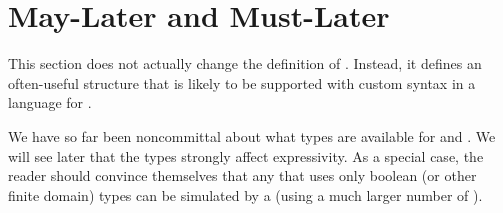 \documentclass[12pt]{article}
\begin{document}
\section{May-Later and Must-Later}  \label{slater}

This section does not actually change the definition of \Contract. Instead, it defines an often-useful \Contract structure that is likely to be supported with custom syntax in a language for \Contracts.

We have so far been noncommittal about what types are available for \GVars and \AParamsDomains. We will see later that the types strongly affect expressivity. As a special case, the reader should convince themselves that any \Contract that uses only boolean (or other finite domain) types can be simulated by a \FSContract (using a much larger number of \States).



\end{document}
